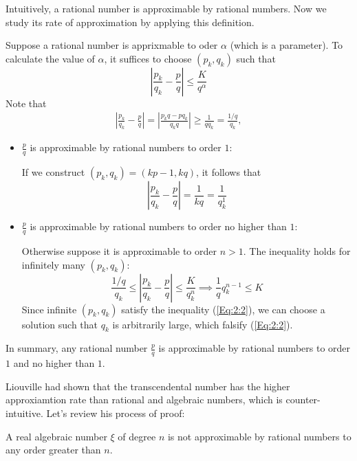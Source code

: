 Intuitively, a rational number is approximable by rational numbers. Now we study its rate of approximation by applying this definition.
\begin{example}
Suppose a rational number is apprixmable to oder $\alpha$ (which is a parameter). To calculate the value of $\alpha$, it suffices to choose $(p_k,q_k)$ such that
\[
\left|
\frac{p_k}{q_k}-\frac{p}{q}
\right|\le\frac{K}{q^\alpha}
\]
Note that
\begin{align*}
\left|
\frac{p_k}{q_k}-\frac{p}{q}
\right|=\left|
\frac{p_kq-pq_k}{q_kq}
\right|\ge\frac{1}{qq_k}=\frac{1/q}{q_k},
\end{align*}
\begin{itemize}
\item
$\frac{p}{q}$ is approximable by rational numbers to order $1$:

If we construct $(p_k,q_k)=(kp-1,kq)$, it follows that
\[
\left|
\frac{p_k}{q_k}-\frac{p}{q}
\right|=\frac{1}{kq}=\frac{1}{q_k^1}
\]
\item
$\frac{p}{q}$ is approximable by rational numbers to order no higher than $1$:

Otherwise suppose it is approximable to order $n>1$. The inequality holds for infinitely many $(p_k,q_k)$:
\begin{equation}
\frac{1/q}{q_k}\le\left|
\frac{p_k}{q_k}-\frac{p}{q}
\right|\le\frac{K}{q^n_k}\implies
\frac{1}{q}q_k^{n-1}\le K\label{Eq:2:2}
\end{equation}
Since infinite $(p_k,q_k)$ satisfy the inequality (\ref{Eq:2:2}), we can choose a solution such that $q_k$ is arbitrarily large, which falsify (\ref{Eq:2:2}).
\end{itemize}
In summary, any rational number $\frac{p}{q}$ is approximable by rational numbers to order $1$ and no higher than $1$. 
\end{example}

Liouville had shown that the transcendental number has the higher approxiamtion rate than rational and algebraic numbers, which is counter-intuitive. Let's review his process of proof:

\begin{theorem}[Liouville, 1844]
A real algebraic number $\xi$ of degree $n$ is not approximable by rational numbers to any order greater than $n$.
\end{theorem}


